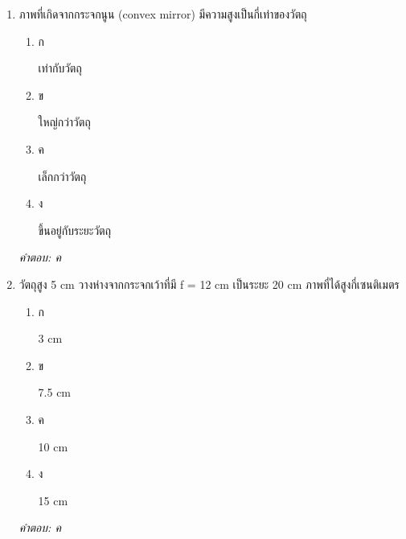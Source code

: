 \documentclass[12pt]{article}
\begin{document}
\begin{enumerate}[label=\arabic*., itemsep=0.5\baselineskip, topsep=0.5\baselineskip, leftmargin=*]
\item ภาพที่เกิดจากกระจกนูน (convex mirror) มีความสูงเป็นกี่เท่าของวัตถุ
\begin{enumerate}[label=\alph*)., itemsep=0.3\baselineskip, topsep=0.3\baselineskip]
\item ก\ 
\begin{minipage}[t]{0.9\linewidth}
\raggedright เท่ากับวัตถุ
\end{minipage}
\item ข\ 
\begin{minipage}[t]{0.9\linewidth}
\raggedright ใหญ่กว่าวัตถุ
\end{minipage}
\item ค\ 
\begin{minipage}[t]{0.9\linewidth}
\raggedright เล็กกว่าวัตถุ
\end{minipage}
\item ง\ 
\begin{minipage}[t]{0.9\linewidth}
\raggedright ขึ้นอยู่กับระยะวัตถุ
\end{minipage}
\end{enumerate}
\vspace{-0.3\baselineskip}
\begin{small}
\textit{คำตอบ: ค}
\end{small}

\item วัตถุสูง 5 cm วางห่างจากกระจกเว้าที่มี f = 12 cm เป็นระยะ 20 cm ภาพที่ได้สูงกี่เซนติเมตร
\begin{enumerate}[label=\alph*)., itemsep=0.3\baselineskip, topsep=0.3\baselineskip]
\item ก\ 
\begin{minipage}[t]{0.9\linewidth}
\raggedright 3 cm
\end{minipage}
\item ข\ 
\begin{minipage}[t]{0.9\linewidth}
\raggedright 7.5 cm
\end{minipage}
\item ค\ 
\begin{minipage}[t]{0.9\linewidth}
\raggedright 10 cm
\end{minipage}
\item ง\ 
\begin{minipage}[t]{0.9\linewidth}
\raggedright 15 cm
\end{minipage}
\end{enumerate}
\vspace{-0.3\baselineskip}
\begin{small}
\textit{คำตอบ: ค}
\end{small}


\end{enumerate}
\end{document}
